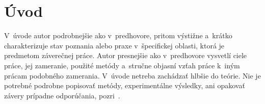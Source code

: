 \setcounter{page}{1}
\setcounter{equation}{0}
\setcounter{figure}{0}
\setcounter{table}{0}

\section*{\'Uvod}
V~úvode autor podrobnejšie ako v~predhovore, pritom výstižne a~krátko
charakterizuje stav poznania alebo praxe v~špecifickej oblasti, ktorá
je predmetom záverečnej práce. Autor presnejšie ako v~predhovore
vysvetlí ciele práce, jej zameranie, použité metódy a~stručne objasní
vzťah práce k~iným prácam podobného zamerania. V~úvode netreba
zachádzať hlbšie do teórie. Nie je potrebné podrobne popisovať metódy,
experimentálne výsledky, ani opakovať závery prípadne odporúčania,
pozri~\citep{kat}.